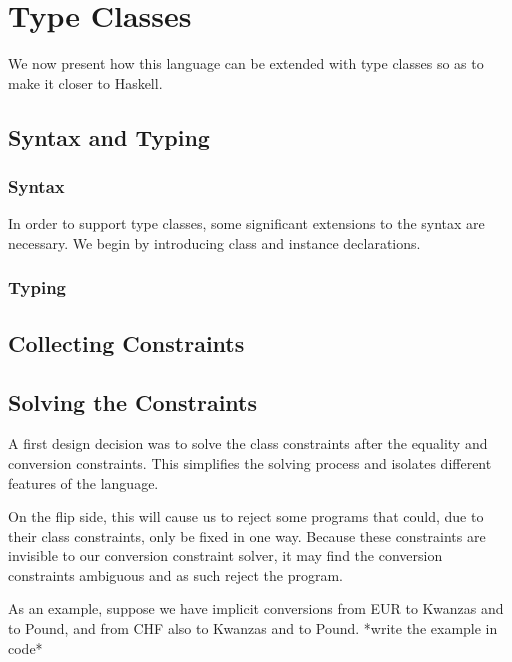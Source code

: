 \chapter{Type Classes}
\label{cha:7}
We now present how this language can be extended with type classes so as to make it closer to Haskell.
\section{Syntax and Typing}
\subsection{Syntax}
In order to support type classes, some significant extensions to the syntax are necessary. We begin by introducing class and instance declarations.
\subsection{Typing}
\section{Collecting Constraints}
\section{Solving the Constraints}
A first design decision was to solve the class constraints after the equality and conversion constraints. This simplifies the solving process and isolates different features of the language.

On the flip side, this will cause us to reject some programs that could, due to their class constraints, only be fixed in one way. Because these constraints are invisible to our conversion constraint solver, it may find the conversion constraints ambiguous and as such reject the program.

As an example, suppose we have implicit conversions from EUR to Kwanzas and to Pound, and from CHF also to Kwanzas and to Pound. *write the example in code*

